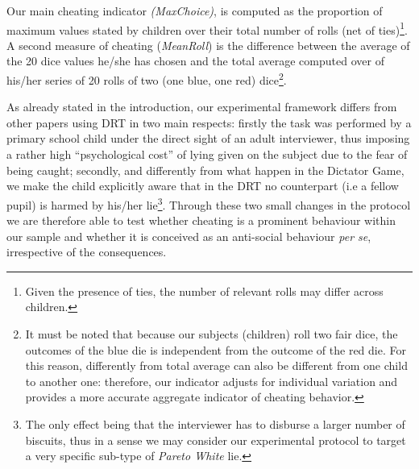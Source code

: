 \documentclass[authoryear, preprint, review, 12pt]{elsarticle}
\begin{document}
\begin{itemize}
Our main cheating indicator \textit{(MaxChoice)}, is computed as the proportion of maximum values stated by children over their total number of rolls (net of ties)\footnote{Given the presence of ties, the number of relevant rolls may differ across children.}. A second measure of cheating (\textit{MeanRoll}) is the difference between the average of the 20 dice values he/she has chosen and the total average computed over of his/her series of 20 rolls of two (one blue, one red) dice\footnote{It must be noted that because our subjects (children) roll two fair dice, the outcomes of the blue die is independent from the outcome of the red die. For this reason, differently from \citet{ariely2015true,ff13} total average can also be different from one child to another one: therefore, our indicator adjusts for individual variation and provides a more accurate aggregate indicator of cheating behavior.}. 

As already stated in the introduction, our experimental framework differs from other papers using DRT \citep{shalvi2011justified, ff13, ariely2015true, houser2013perceptions, gachter2016intrinsic} in two main respects: firstly the task was performed by a primary school child under the direct sight of an adult interviewer, thus imposing a rather high \enquote{psychological cost} of lying given on the subject due to the fear of being caught; secondly, and differently from what happen in the Dictator Game, we make the child explicitly aware that in the DRT no counterpart (i.e a fellow pupil) is harmed by his/her lie\footnote{The only effect being that the interviewer has to disburse a larger number of biscuits, thus in a sense we may consider our experimental protocol to target a very specific sub-type of \textit{Pareto White} lie.}. Through these two small changes in the protocol we are therefore able to test whether cheating is a prominent behaviour within our sample and whether it is conceived as an anti-social behaviour \textit{per se}, irrespective of the consequences. 


\end{itemize}
\end{document}
